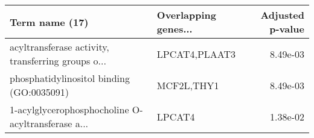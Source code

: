 \begin{tabular}{llr}
\toprule
                                    Term name (17) & Overlapping genes... &  Adjusted p-value \\
\midrule
acyltransferase activity, transferring groups o... &        LPCAT4,PLAAT3 &          8.49e-03 \\
         phosphatidylinositol binding (GO:0035091) &           MCF2L,THY1 &          8.49e-03 \\
1-acylglycerophosphocholine O-acyltransferase a... &               LPCAT4 &          1.38e-02 \\
\bottomrule
\end{tabular}
